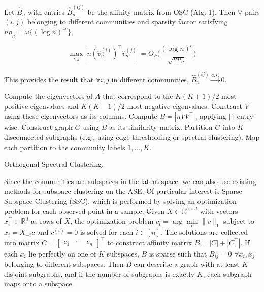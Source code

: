 \documentclass[
  11pt,
]{article}
\begin{document}
\begin{theorem}
\label{theorem4} 
Let $\hat{B}_n$ with entries $\hat{B}_n^{(ij)}$ be the affinity matrix from OSC 
(Alg. 1). Then $\forall$ pairs $(i, j)$ belonging to different communities 
and sparsity factor satisfying $n \rho_n = \omega\{(\log n)^{4c}\}$, 

\begin{equation} \label{eq:thm4}
\max_{i, j} |n (\hat{v}_n^{(i)})^\top \hat{v}_n^{(j)}| = 
O_P \Big( \frac{(\log n)^c}{\sqrt{n \rho_n}} \Big)
\end{equation}

This provides the result that $\forall i, j$ in different communities, 
$\hat{B}_n^{(ij)} \stackrel{a.s.}{\to} 0$.
\end{theorem}

\begin{algorithm}[t]
  \DontPrintSemicolon
  \SetAlgoLined
    Compute the eigenvectors of $A$ that correspond to the $K (K+1) / 2$ most 
    positive eigenvalues and $K (K-1) / 2$ most negative eigenvalues. Construct 
    $V$ using these eigenvectors as its columns.\;
    Compute $B = |n V V^\top|$, applying $|\cdot|$ entry-wise.\;
    Construct graph $G$ using $B$ as its similarity matrix.\;
    Partition $G$ into $K$ disconnected subgraphs  
    (e.g., using edge thresholding or spectral clustering).\;
    Map each partition to the community labels $1, ..., K$.\;
  \caption{Orthogonal Spectral Clustering.}
\end{algorithm}

Since the communities are subspaces in the latent space, we can also use
existing methods for subspace clustering on the ASE. Of particular
interest is Sparse Subspace Clustering (SSC), which is performed by
solving an optimization problem for each observed point in a sample.
Given \(X \in \mathbb{R}^{n \times d}\) with vectors
\(x_i^\top \in \mathbb{R}^d\) as rows of \(X\), the optimization problem
\(c_i = \arg\min\limits_{c} \|c\|_1\) subject to \(x_i = X_{-i} c\) and
\(c^{(i)} = 0\) is solved for each \(i \in [n]\). The solutions are
collected into matrix
\(C = \begin{bmatrix} c_1 & \cdots & c_n \end{bmatrix}^\top\) to
construct affinity matrix \(B = |C| + |C^\top|\). If each \(x_i\) lie
perfectly on one of \(K\) subspaces, \(B\) is sparse such that
\(B_{ij} = 0\) \(\forall x_i, x_j\) belonging to different subspaces.
Then \(B\) can describe a graph with at least \(K\) disjoint subgraphs,
and if the number of subgraphs is exactly \(K\), each subgraph maps onto
a subspace.
\end{document}
